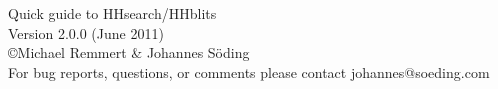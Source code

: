 \documentclass[11pt,a4paper]{article}
\begin{document}


\begin{center}

\vspace{30mm}
{\Huge Quick guide to HHsearch/HHblits}\\[2mm]
  Version 2.0.0 (June 2011)\\[2mm]
\copyright  Michael Remmert \& Johannes S\"oding\\[2mm]
For bug reports, questions, or comments please contact johannes@soeding.com
\end{center}

\end{document}

